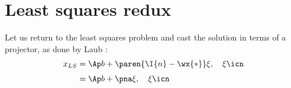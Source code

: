 \section{Least squares redux}

Let us return to the least squares problem and cast the solution in terms of a projector, as done by Laub \cite[p. 60]{Laub2005}:
\begin{equation}
  \begin{split}
    x_{LS} &= \Ap b + \paren{\I{n} - \wx{*}} \xi, \quad \xi\icn \\[3pt]
           &= \Ap b + \pna \xi, \quad \xi\icn
  \end{split}
\end{equation}



\endinput